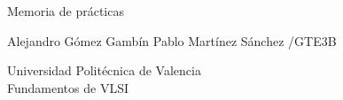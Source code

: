 \begin{titlepage}
\begin{center}
  \end{center}
  \vspace{1 cm}
  \begin{center}
    {\large
      Memoria de prácticas%
    }\\
    \vspace{0.2cm}
    {\Large \begin{center}
      Alejandro Gómez Gambín \space \space \space \space Pablo Martínez Sánchez
      \newline /GTE3B%
      \end{center}
    
    }
  \end{center}
  \vfill
  \begin{center}
  Universidad Politécnica de Valencia\\
  Fundamentos de VLSI
  \end{center}
\end{titlepage}
\clearpage